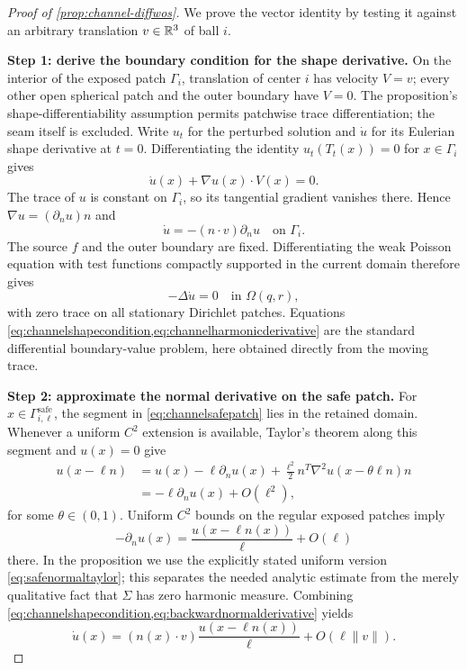 \begin{proof}[Proof of \cref{prop:channel-diffwos}]
We prove the vector identity by testing it against an arbitrary translation
$v\in\mathbb{R}^3$ of ball $i$.

\textbf{Step 1: derive the boundary condition for the shape derivative.}
On the interior of the exposed patch $\Gamma_i$, translation of center $i$
has velocity $V=v$; every other open spherical patch and the outer boundary
have $V=0$.  The proposition's shape-differentiability assumption permits
patchwise trace differentiation; the seam itself is excluded.  Write $u_t$
for the perturbed solution and $\dot u$ for its Eulerian shape derivative at
$t=0$.  Differentiating the
identity $u_t(T_t(x))=0$ for $x\in\Gamma_i$ gives
\begin{equation}
 \dot u(x)+\nabla u(x)\cdot V(x)=0.
 \label{eq:channelmaterialboundary}
\end{equation}
The trace of $u$ is constant on $\Gamma_i$, so its tangential gradient
vanishes there.  Hence $\nabla u=(\partial_nu)n$ and
\begin{equation}
 \dot u=-(n\cdot v)\partial_nu\quad\text{on }\Gamma_i.
 \label{eq:channelshapecondition}
\end{equation}
The source $f$ and the outer boundary are fixed.  Differentiating the weak
Poisson equation with test functions compactly supported in the current
domain therefore gives
\begin{equation}
 -\Delta\dot u=0\quad\text{in }\Omega(q,r),
 \label{eq:channelharmonicderivative}
\end{equation}
with zero trace on all stationary Dirichlet patches.  Equations
\cref{eq:channelshapecondition,eq:channelharmonicderivative} are the standard
differential boundary-value problem, here obtained directly from the moving
trace.

\textbf{Step 2: approximate the normal derivative on the safe patch.}
For $x\in\Gamma_{i,\ell}^{\mathrm{safe}}$, the segment in
\cref{eq:channelsafepatch} lies in the retained domain.  Whenever a uniform
$C^2$ extension is available, Taylor's theorem along this segment and
$u(x)=0$ give
\begin{align}
 u(x-\ell n)
 &=u(x)-\ell\partial_nu(x)
   +\frac{\ell^2}{2}
     n^T\nabla^2u(x-\theta\ell n)n \\
 &=-\ell\partial_nu(x)+O(\ell^2),
 \label{eq:backwardnormaltaylor}
\end{align}
for some $\theta\in(0,1)$.  Uniform $C^2$ bounds on the regular exposed
patches imply
\begin{equation}
 -\partial_nu(x)=\frac{u(x-\ell n(x))}{\ell}+O(\ell)
 \label{eq:backwardnormalderivative}
\end{equation}
there.  In the proposition we use the explicitly stated uniform version
\cref{eq:safenormaltaylor}; this separates the needed analytic estimate from
the merely qualitative fact that $\Sigma$ has zero harmonic measure.
Combining
\cref{eq:channelshapecondition,eq:backwardnormalderivative} yields
\begin{equation}
 \dot u(x)=(n(x)\cdot v)
 \frac{u(x-\ell n(x))}{\ell}+O(\ell\|v\|).
 \label{eq:offsetboundarydata}
\end{equation}


\end{proof}

